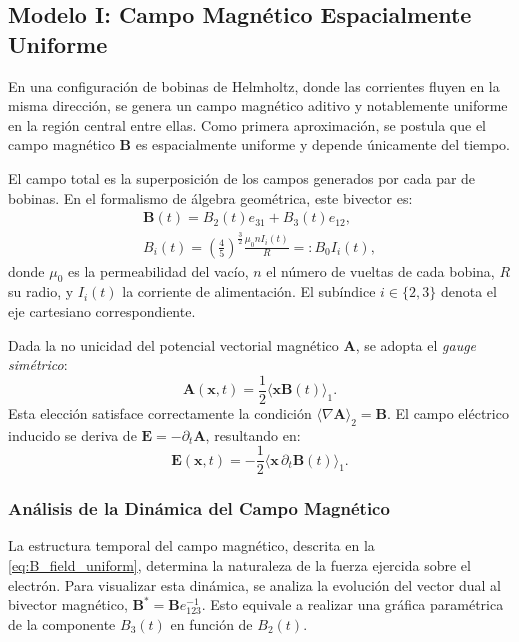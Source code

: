 \subsection{Modelo I: Campo Magnético Espacialmente Uniforme}
\label{ssec:campo_uniforme}

En una configuración de bobinas de Helmholtz, donde las corrientes fluyen
en la misma dirección, se genera un campo magnético aditivo y
notablemente uniforme en la región central entre ellas. Como primera
aproximación, se postula que el campo magnético $\boldsymbol{B}$ es
espacialmente uniforme y depende únicamente del tiempo.

El campo total es la superposición de los campos generados por cada par
de bobinas. En el formalismo de álgebra geométrica, este bivector es:
\begin{gather}
	\boldsymbol{B}(t) = B_2(t) e_{31} + B_3(t) e_{12},
	\label{eq:B_field_uniform}
	\\
	B_i(t) = \left( \frac{4}{5} \right)^{\frac{3}{2}}
	\frac{\mu_0 n I_{i}(t)}{R} =: B_0 I_i(t),
	\label{eq:B_field_magnitude}
\end{gather}
%
donde $\mu_0$ es la permeabilidad del vacío, $n$ el número de vueltas de
cada bobina, $R$ su radio, y $I_i(t)$ la corriente de alimentación. El
subíndice $i \in \{2, 3\}$ denota el eje cartesiano correspondiente.

Dada la no unicidad del potencial vectorial magnético $\boldsymbol{A}$, se
adopta el \emph{gauge simétrico}:
%
\begin{equation}
	\boldsymbol{A}(\boldsymbol{x}, t) = \frac{1}{2}
	\langle \boldsymbol{x} \boldsymbol{B}(t) \rangle_{1}.
	\label{eq:symmetric_gauge}
\end{equation}
%
Esta elección satisface correctamente la condición
$\langle \nabla \boldsymbol{A} \rangle_{2} = \boldsymbol{B}$.
El campo eléctrico inducido se deriva de
$\boldsymbol{E} = - \partial_t \boldsymbol{A}$, resultando en:
%
\begin{equation}
	\boldsymbol{E}(\boldsymbol{x}, t) = - \frac{1}{2} \langle \boldsymbol{x}
	\, \partial_t \boldsymbol{B}(t) \rangle_{1}.
	\label{eq:E_induced_uniform}
\end{equation}

\subsubsection{Análisis de la Dinámica del Campo Magnético}
\label{sssec:dinamica_b}

La estructura temporal del campo magnético, descrita en la
\cref{eq:B_field_uniform}, determina la naturaleza de la fuerza ejercida
sobre el electrón. Para visualizar esta dinámica, se analiza la
evolución del vector dual al bivector magnético,
$\boldsymbol{B}^* = \boldsymbol{B}e_{123}^{-1}$. Esto equivale a realizar
una gráfica paramétrica de la componente $B_3(t)$ en función de $B_2(t)$.

